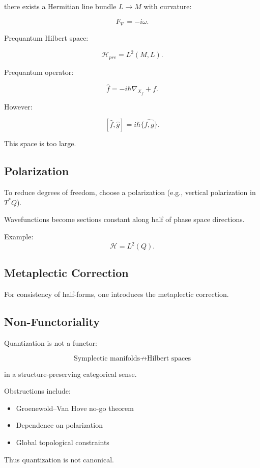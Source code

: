 there exists a Hermitian line bundle $L \to M$ with curvature:

\[
F_\nabla = -i\omega.
\]

Prequantum Hilbert space:

\[
\mathcal H_{pre} = L^2(M,L).
\]

Prequantum operator:

\[
\hat f = -i\hbar \nabla_{X_f} + f.
\]

However:

\[
[\hat f, \hat g] = i\hbar \widehat{\{f,g\}}.
\]

This space is too large.

\subsection{Polarization}

To reduce degrees of freedom, choose a polarization 
(e.g., vertical polarization in $T^*Q$). 

Wavefunctions become sections constant along half of phase space directions.

Example:
\[
\mathcal H = L^2(Q).
\]

\subsection{Metaplectic Correction}

For consistency of half-forms, one introduces the metaplectic correction.

\subsection{Non-Functoriality}

Quantization is not a functor:

\[
\text{Symplectic manifolds}
\not\longrightarrow
\text{Hilbert spaces}
\]

in a structure-preserving categorical sense.

Obstructions include:

\begin{itemize}
\item Groenewold–Van Hove no-go theorem
\item Dependence on polarization
\item Global topological constraints
\end{itemize}

Thus quantization is not canonical.

